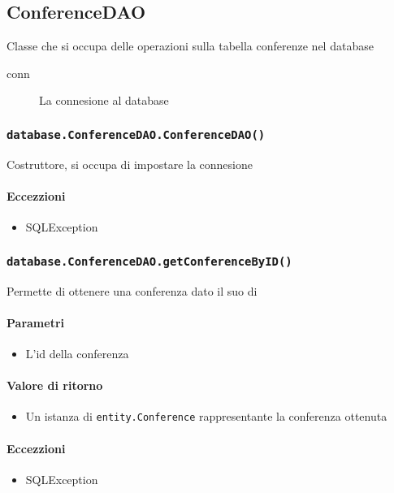 \subsection{ConferenceDAO}
Classe che si occupa delle operazioni sulla tabella conferenze nel database
\begin{description}
\item[conn] La connesione al database
\end{description}

\subsubsection{\texttt{database.ConferenceDAO.ConferenceDAO()}}
Costruttore, si occupa di impostare la connesione
\paragraph{Eccezzioni}
\begin{itemize}
  \item SQLException
\end{itemize}

\subsubsection{\texttt{database.ConferenceDAO.getConferenceByID()}}
Permette di ottenere una conferenza dato il suo di
\paragraph{Parametri}
\begin{itemize}
\item L'id della conferenza
\end{itemize}
\paragraph{Valore di ritorno}
\begin{itemize}
\item Un istanza di \texttt{entity.Conference} rappresentante la conferenza ottenuta
\end{itemize}
\paragraph{Eccezzioni}
\begin{itemize}
  \item SQLException
\end{itemize}

